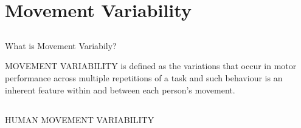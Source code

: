 
\section{Movement Variability}


\subsection{}
{


\begin{frame}{What is Movement Variabily?}

\LARGE
MOVEMENT VARIABILITY is defined as the variations that occur in motor
performance across multiple repetitions of a task and such behaviour is 
an inherent feature within and between each person's movement.
\end{frame}
}


\subsection{}
{

\begin{frame}{HUMAN MOVEMENT VARIABILITY}
    \begin{figure}
	\caption{} 
   \end{figure}
	
\end{frame}
}


